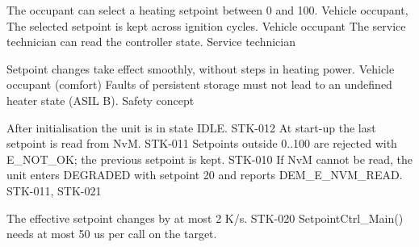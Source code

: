 %

  {The occupant can select a heating setpoint between 0 and 100.}
  {Vehicle occupant, }
  {The selected setpoint is kept across ignition cycles.}
  {Vehicle occupant}
  {The service technician can read the controller state.}
  {Service technician}

  {Setpoint changes take effect smoothly, without steps in heating power.}
  {Vehicle occupant (comfort)}
  {Faults of persistent storage must not lead to an undefined heater state (ASIL B).}
  {Safety concept}

  {After initialisation the unit is in state IDLE.}
  {STK-012}
  {At start-up the last setpoint is read from NvM.}
  {STK-011}
  {Setpoints outside 0..100 are rejected with E_NOT_OK; the previous setpoint is kept.}
  {STK-010}
  {If NvM cannot be read, the unit enters DEGRADED with setpoint 20 and reports DEM_E_NVM_READ.}
  {STK-011, STK-021}

  {The effective setpoint changes by at most 2 K/s.}
  {STK-020}
  {SetpointCtrl_Main() needs at most 50 us per call on the target.}
  {}


